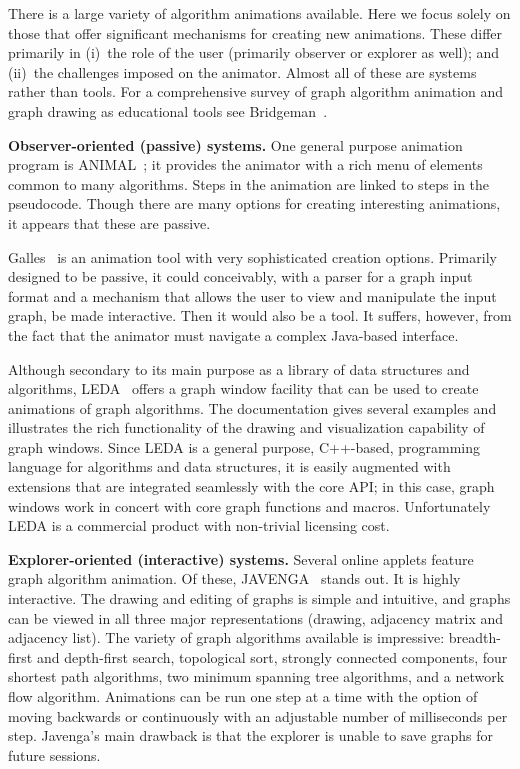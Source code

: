 There is a large variety of algorithm animations available. Here we focus solely on those that offer significant mechanisms for creating new animations.
These differ primarily in (i)~the role of the user (primarily observer
or explorer as well); and
(ii)~the challenges imposed on the animator.
Almost all of these are systems rather than tools.
For a comprehensive survey of graph algorithm animation and graph drawing
as educational tools see Bridgeman~\cite{2013-GDBook-Bridgeman}. 

\textbf{Observer-oriented (passive) systems.}
One general purpose animation program is ANIMAL~\cite{2002-JVLC-Roessling,ANIMAL};
it provides the animator
with a rich menu
of elements common to many algorithms.
Steps in the animation are linked to steps in the pseudocode.
Though there are many options for creating interesting animations,
it appears that these are passive.

Galles~\cite{Galles} is an animation tool with very
sophisticated creation options.
Primarily designed to be passive, it could conceivably, with a parser
for a graph input format and a mechanism that allows the user to view and
manipulate the input graph, be made interactive.
Then it would also be a tool.
It suffers, however, from the fact that the
animator must navigate a complex Java-based interface.

Although secondary to its main purpose as a library of data structures and
algorithms,
LEDA~\cite{1999-LEDA-Mehlhorn} offers a graph window facility that can be
used to create animations of graph algorithms.
The documentation gives several examples and illustrates the rich functionality of
the drawing and visualization capability of graph windows.
Since LEDA is a general purpose, C++-based, programming language for
algorithms and data structures, it is easily augmented with extensions that
are integrated seamlessly with the core API; in this case, graph windows work
in concert with core graph functions and macros.
Unfortunately LEDA is a commercial product with
non-trivial licensing cost.

\textbf{Explorer-oriented (interactive) systems.}
Several online applets feature graph algorithm animation. Of these,
JAVENGA~\cite{JAVENGA} stands out. It is highly interactive. The drawing and
editing of
graphs is simple and intuitive, and graphs can be viewed in all three major
representations (drawing, adjacency matrix and adjacency list).
The variety of graph algorithms available is impressive:
breadth-first and depth-first search, topological sort, strongly connected
components, four shortest path algorithms, two minimum spanning tree
algorithms, and a network flow algorithm.
Animations can be run one step at a time with the option of moving backwards
or continuously with an adjustable number of milliseconds per step.
Javenga's main drawback is that the explorer is unable to save graphs for
future sessions.

